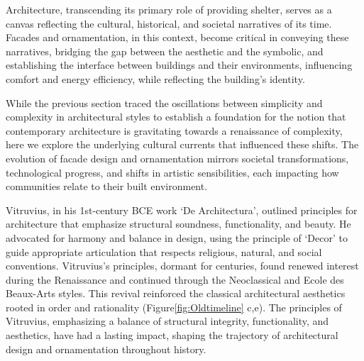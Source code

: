 


Architecture, transcending its primary role of providing shelter, serves as a canvas reflecting the cultural, historical, and societal narratives of its time.
Facades and ornamentation, in this context, become critical in conveying these narratives, bridging the gap between the aesthetic and the symbolic, and establishing the interface between buildings and their environments, influencing comfort and energy efficiency, while reflecting the building's identity\cite{Kamal2020}.

While the previous section traced the oscillations between simplicity and complexity in architectural styles to establish a foundation for the notion that contemporary architecture is gravitating towards a renaissance of complexity, here we explore the underlying cultural currents that influenced these shifts.
The evolution of facade design and ornamentation mirrors societal transformations, technological progress, and shifts in artistic sensibilities, each impacting how communities relate to their built environment.


Vitruvius, in his 1st-century BCE work `De Architectura', outlined principles for architecture that emphasize structural soundness, functionality, and beauty\cite{Ostwald2023}.
He advocated for harmony and balance in design, using the principle of `Decor' to guide appropriate articulation that respects religious, natural, and social conventions\cite{Lefas2000}.
Vitruvius's principles, dormant for centuries, found renewed interest during the Renaissance and continued through the Neoclassical and Ecole des Beaux-Arts styles\cite{Wikipedia2023}.
This revival reinforced the classical architectural aesthetics rooted in order and rationality (Figure\ref{fig:Oldtimeline} c,e).
The principles of Vitruvius, emphasizing a balance of structural integrity, functionality, and aesthetics, have had a lasting impact, shaping the trajectory of architectural design and ornamentation throughout history.


